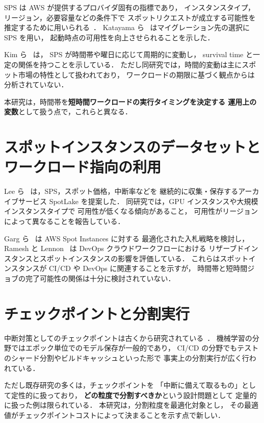 \documentclass[11pt,a4paper]{ltjsreport}
\begin{document}
SPS は AWS が提供するプロバイダ固有の指標であり，
インスタンスタイプ，リージョン，必要容量などの条件下で
スポットリクエストが成立する可能性を推定するために用いられる~\cite{AWSSPS}．
Katayama ら~\cite{Katayama2022} はマイグレーション先の選択に SPS を用い，
起動時点の可用性を向上させられることを示した．

Kim ら~\cite{Kim2024SpotInterruption} は，
SPS が時間帯や曜日に応じて周期的に変動し，
survival time と一定の関係を持つことを示している．
ただし同研究では，時間的変動は主にスポット市場の特性として扱われており，
ワークロードの期限に基づく観点からは分析されていない．

本研究は，時間帯を\textbf{短時間ワークロードの実行タイミングを決定する
運用上の変数}として扱う点で，これらと異なる．

\section{スポットインスタンスのデータセットとワークロード指向の利用}

Lee ら~\cite{Lee2022SpotLake} は，SPS，スポット価格，中断率などを
継続的に収集・保存するアーカイブサービス SpotLake を提案した．
同研究では，GPU インスタンスや大規模インスタンスタイプで
可用性が低くなる傾向があること，
可用性がリージョンによって異なることを報告している．

Garg ら~\cite{Garg2025} は AWS Spot Instances に対する
最適化された入札戦略を検討し，
Ramesh と Lennon~\cite{Ramesh2025} は DevOps クラウドワークフローにおける
リザーブドインスタンスとスポットインスタンスの影響を評価している．
これらはスポットインスタンスが CI/CD や DevOps に関連することを示すが，
時間帯と短時間ジョブの完了可能性の関係は十分に検討されていない．

\section{チェックポイントと分割実行}

中断対策としてのチェックポイントは古くから研究されている~\cite{Lin2022Survey}．
機械学習の分野ではエポック単位でのモデル保存が一般的であり，
CI/CD の分野でもテストのシャード分割やビルドキャッシュといった形で
事実上の分割実行が広く行われている．

ただし既存研究の多くは，チェックポイントを
「中断に備えて取るもの」として定性的に扱っており，
\textbf{どの粒度で分割すべきか}という設計問題として
定量的に扱った例は限られている．
本研究は，分割粒度を最適化対象とし，
その最適値がチェックポイントコストによって決まることを示す点で新しい．
\end{document}
